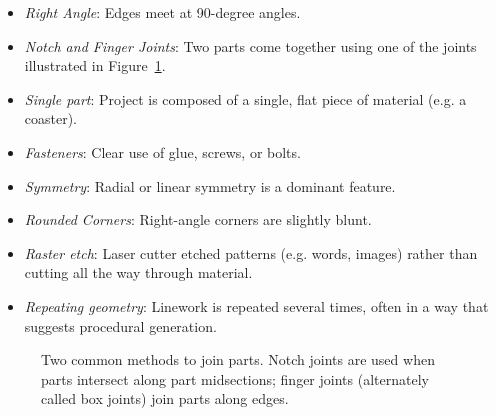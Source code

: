 \documentclass{article}
\begin{document}
\begin{itemize}
\item \textit{Right Angle}: Edges meet at 90-degree angles.
\item \textit{Notch and Finger Joints}: Two parts come together using one of
  the joints illustrated in Figure~\ref{fig:joint}.
\item \textit{Single part}: Project is composed of a single, flat piece of
  material (e.g. a coaster).
\item \textit{Fasteners}: Clear use of glue, screws, or bolts.
\item \textit{Symmetry}: Radial or linear symmetry is a dominant feature.
\item \textit{Rounded Corners}: Right-angle corners are slightly blunt.
\item \textit{Raster etch}: Laser cutter etched patterns (e.g. words,
  images) rather than cutting all the way through material.
\item \textit{Repeating geometry}: Linework is repeated several times,
  often in a way that suggests procedural generation.
\end{itemize}

\begin{figure}[h]
\centering 
{}
\caption{Two common methods to join parts. Notch joints are used when
  parts intersect along part midsections; finger joints (alternately
  called box joints) join parts along edges.}
\label{fig:joint}
\end{figure}
\end{document}

